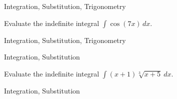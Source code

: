 \begin{tagblock}{Integration, Substitution, Trigonometry}
\begin{question}

Evaluate the indefinite integral $\displaystyle \int \cos(7x) \, dx$. 



	
	
\begin{tags}
	  Integration, Substitution, Trigonometry
\end{tags}
	
\begin{diary}
	   
\end{diary}
	
\begin{solution}
	   
	    \end{enumerate}
\end{solution}
	
\end{question}

\end{tagblock}

\begin{tagblock}{Integration, Substitution}
\begin{question}

Evaluate the indefinite integral $\displaystyle \int (x+1)\sqrt[3]{x+5} \ dx$. 



	
	
\begin{tags}
	  Integration, Substitution
\end{tags}
	
\begin{diary}
	   
\end{diary}
	
\begin{solution}
	   
	    \end{enumerate}
\end{solution}
	
\end{question}

\end{tagblock}

